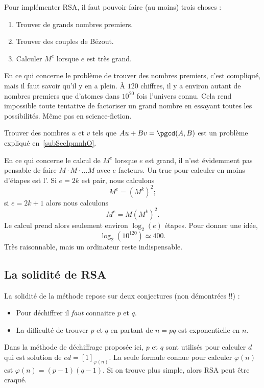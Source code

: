 Pour implémenter RSA, il faut pouvoir faire (au moins) trois choses :
\begin{enumerate}
	\item
	      Trouver de grands nombres premiers.
	\item
	      Trouver des couples de Bézout.
	\item
	      Calculer \( M^e\) lorsque \( e\) est très grand.
\end{enumerate}
En ce qui concerne le problème de trouver des nombres premiers, c'est compliqué, mais il faut savoir qu'il y en a plein. À \( 120\) chiffres, il y a environ autant de nombres premiers que d'atomes dans \( 10^{20}\) fois l'univers connu. Cela rend impossible toute tentative de factoriser un grand nombre en essayant toutes les possibilités. Même pas en science-fiction.

Trouver des nombres \( u\) et \( v\) tels que \( Au+Bv=\pgcd(A,B)\) est un problème expliqué en~\ref{subSecIpmnhO}.

En ce qui concerne le calcul de \( M^e\) lorsque \( e\) est grand, il n'est évidemment pas pensable de faire \( M\cdot M\cdot\ldots M\) avec \( e\) facteurs. Un truc pour calculer en moins d'étapes est l'. Si \( e=2k\) est pair, nous calculons
\begin{equation}
	M^e=(M^k)^2;
\end{equation}
si \( e=2k+1\) alors nous calculons
\begin{equation}
	M^e=M(M^k)^2.
\end{equation}
Le calcul prend alors seulement environ \( \log_2(e) \) étapes. Pour donner une idée,
\begin{equation}
	\log_2(10^{120})\simeq 400.
\end{equation}
Très raisonnable, mais un ordinateur reste indispensable.

\subsection{La solidité de RSA}

La solidité de la méthode repose sur deux conjectures (non démontrées !!) :
\begin{itemize}
	\item Pour déchiffrer il \emph{faut} connaitre \( p\) et \( q\).
	\item La difficulté de trouver \( p\) et \( q\) en partant de \( n=pq\) est exponentielle en \( n\).
\end{itemize}
Dans la méthode de déchiffrage proposée ici, \( p\) et \( q\) sont utilisés pour calculer \( d\) qui est solution de \( ed=[1]_{\varphi(n)}\). La seule formule connue pour calculer \( \varphi(n)\) est \( \varphi(n)=(p-1)(q-1)\). Si on trouve plus simple, alors RSA peut être craqué.

